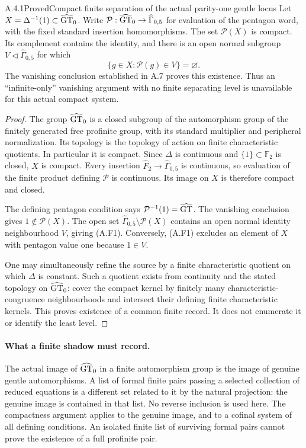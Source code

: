 \begin{result}{A.4.1}{Proved}{Compact finite separation of the actual parity-one gentle locus}
Let $X=\Delta^{-1}(1)\subset\widehat{\mathrm{GT}}_0$. Write
$\mathcal P:\widehat{\mathrm{GT}}_0\to\widehat\Gamma_{0,5}$ for evaluation of the pentagon word, with the fixed standard insertion homomorphisms. The set $\mathcal P(X)$ is compact. Its complement contains the identity, and there is an open normal subgroup $V\triangleleft\widehat\Gamma_{0,5}$ for which
\[
 \{g\in X:\mathcal P(g)\in V\}=\varnothing.
 \tag{A.F1}
\]
The vanishing conclusion established in A.7 proves this existence. Thus an ``infinite-only'' vanishing argument with no finite separating level is unavailable for this actual compact system.
\end{result}
\begin{proof}
The group $\widehat{\mathrm{GT}}_0$ is a closed subgroup of the automorphism group of the finitely generated free profinite group, with its standard multiplier and peripheral normalization. Its topology is the topology of action on finite characteristic quotients. In particular it is compact. Since $\Delta$ is continuous and $\{1\}\subset\mathbb F_2$ is closed, $X$ is compact. Every insertion $\widehat F_2\to\widehat\Gamma_{0,5}$ is continuous, so evaluation of the finite product defining $\mathcal P$ is continuous. Its image on $X$ is therefore compact and closed.

The defining pentagon condition says $\mathcal P^{-1}(1)=\widehat{\mathrm{GT}}$. The vanishing conclusion gives $1\notin\mathcal P(X)$. The open set $\widehat\Gamma_{0,5}\setminus\mathcal P(X)$ contains an open normal identity neighbourhood $V$, giving (A.F1). Conversely, (A.F1) excludes an element of $X$ with pentagon value one because $1\in V$.

One may simultaneously refine the source by a finite characteristic quotient on which $\Delta$ is constant. Such a quotient exists from continuity and the stated topology on $\widehat{\mathrm{GT}}_0$: cover the compact kernel by finitely many characteristic-congruence neighbourhoods and intersect their defining finite characteristic kernels. This proves existence of a common finite record. It does not enumerate it or identify the least level.
\end{proof}

\paragraph{What a finite shadow must record.}
The actual image of $\widehat{\mathrm{GT}}_0$ in a finite automorphism group is the image of genuine gentle automorphisms. A list of formal finite pairs passing a selected collection of reduced equations is a different set related to it by the natural projection: the genuine image is contained in that list. No reverse inclusion is used here. The compactness argument applies to the genuine image, and to a cofinal system of all defining conditions. An isolated finite list of surviving formal pairs cannot prove the existence of a full profinite pair.

